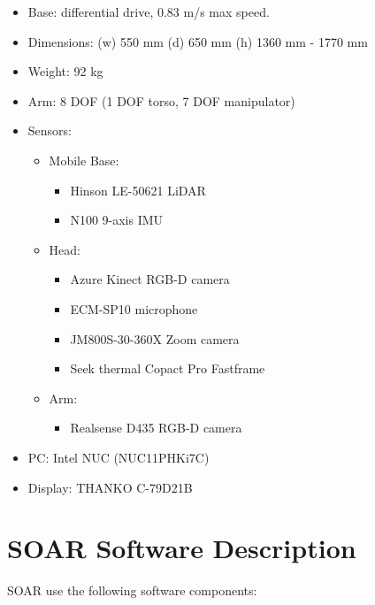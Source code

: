 \begin{itemize}
	\item Base: differential drive, 0.83 m/s max speed.
	\item Dimensions: (w) 550 mm (d) 650 mm (h) 1360 mm - 1770 mm
	\item Weight: 92 kg
	\item Arm: 8 DOF (1 DOF torso, 7 DOF manipulator)
	\item Sensors:
	      \begin{itemize}
		      \item Mobile Base:
		            \begin{itemize}
			            \item Hinson LE-50621 LiDAR
			            \item N100 9-axis IMU
		            \end{itemize}
		      \item Head:
		            \begin{itemize}
			            \item Azure Kinect RGB-D camera
			            \item ECM-SP10 microphone
			            \item JM800S-30-360X Zoom camera
			            \item Seek thermal Copact Pro Fastframe
		            \end{itemize}
		      \item Arm:
		            \begin{itemize}
			            \item Realsense D435 RGB-D camera
		            \end{itemize}
	      \end{itemize}
	\item PC: Intel NUC (NUC11PHKi7C)
	\item Display: THANKO C-79D21B
\end{itemize}

\section*{SOAR Software Description}

SOAR use the following software components:

